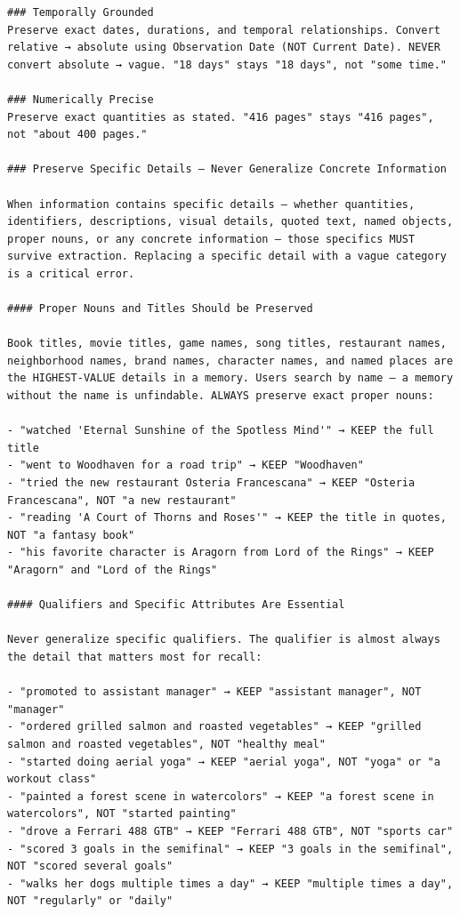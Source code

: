 \documentclass[11pt]{article}
\begin{document}
\begin{lstlisting}
### Temporally Grounded
Preserve exact dates, durations, and temporal relationships. Convert relative → absolute using Observation Date (NOT Current Date). NEVER convert absolute → vague. "18 days" stays "18 days", not "some time."

### Numerically Precise
Preserve exact quantities as stated. "416 pages" stays "416 pages", not "about 400 pages."

### Preserve Specific Details — Never Generalize Concrete Information

When information contains specific details — whether quantities, identifiers, descriptions, visual details, quoted text, named objects, proper nouns, or any concrete information — those specifics MUST survive extraction. Replacing a specific detail with a vague category is a critical error.

#### Proper Nouns and Titles Should be Preserved

Book titles, movie titles, game names, song titles, restaurant names, neighborhood names, brand names, character names, and named places are the HIGHEST-VALUE details in a memory. Users search by name — a memory without the name is unfindable. ALWAYS preserve exact proper nouns:

- "watched 'Eternal Sunshine of the Spotless Mind'" → KEEP the full title
- "went to Woodhaven for a road trip" → KEEP "Woodhaven"
- "tried the new restaurant Osteria Francescana" → KEEP "Osteria Francescana", NOT "a new restaurant"
- "reading 'A Court of Thorns and Roses'" → KEEP the title in quotes, NOT "a fantasy book"
- "his favorite character is Aragorn from Lord of the Rings" → KEEP "Aragorn" and "Lord of the Rings"

#### Qualifiers and Specific Attributes Are Essential

Never generalize specific qualifiers. The qualifier is almost always the detail that matters most for recall:

- "promoted to assistant manager" → KEEP "assistant manager", NOT "manager"
- "ordered grilled salmon and roasted vegetables" → KEEP "grilled salmon and roasted vegetables", NOT "healthy meal"
- "started doing aerial yoga" → KEEP "aerial yoga", NOT "yoga" or "a workout class"
- "painted a forest scene in watercolors" → KEEP "a forest scene in watercolors", NOT "started painting"
- "drove a Ferrari 488 GTB" → KEEP "Ferrari 488 GTB", NOT "sports car"
- "scored 3 goals in the semifinal" → KEEP "3 goals in the semifinal", NOT "scored several goals"
- "walks her dogs multiple times a day" → KEEP "multiple times a day", NOT "regularly" or "daily"


\end{lstlisting}
\end{document}
